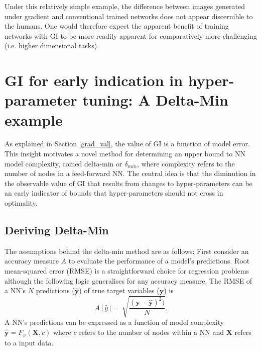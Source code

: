 \documentclass{article}
\begin{document}

Under this relatively simple example, the difference between images generated under gradient and conventional trained networks does not appear discernible to the humans. One would therefore expect the apparent benefit of training networks with GI to be more readily apparent for comparatively more challenging (i.e. higher dimensional tasks).


\section{GI for early indication in hyper-parameter tuning: A Delta-Min example}
\label{sec:delta_min}

As explained in Section \ref{grad_val}, the value of GI is a function of model error. This insight motivates a novel method for determining an upper bound to NN model complexity, coined delta-min or $\delta_{min}$, where complexity refers to the number of nodes in a feed-forward NN. The central idea is that the diminution in the observable value of GI that results from changes to hyper-parameters can be an early indicator of bounds that hyper-parameters should not cross in optimality.

\subsection{Deriving Delta-Min}
The assumptions behind the delta-min method are as follows: First consider an accuracy measure $A$ to evaluate the performance of a model's predictions. Root mean-squared error (RMSE) is a straightforward choice for regression problems although the following logic generalises for any accuracy measure. The RMSE of a NN's $N$ predictions ($\mathbf{\hat{y}}$) of true target variables ($\mathbf{y}$) is 
\begin{equation}
	\label{rmse}
	A[\hat{y}] = \sqrt{\frac{(\mathbf{y} - \mathbf{\hat{y}})^2)}{N}}.
\end{equation}
A NN's predictions can be expressed as a function of model complexity $\mathbf{\hat{y}} = F_{\varphi}(\mathbf{X}, c)$ where $c$ refers to the number of nodes within a NN and $\mathbf{X}$ refers to a input data. 
  
\end{document}
